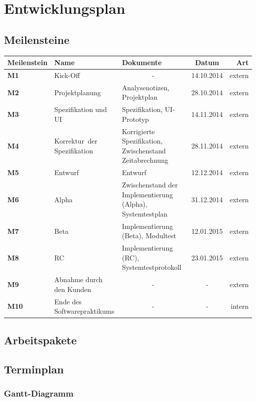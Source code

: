 \documentclass[11pt]{article}
\begin{document}
\section{Entwicklungsplan}

\subsection{Meilensteine}

\begin{tabular}{|l|p{3.5cm}|p{3.5cm}|c|r|}
	\hline
	Meilenstein & Name & Dokumente & Datum & Art \\
	\hline \hline
	\textbf{M1} & Kick-Off & \multicolumn{1}{|c|}{-} & 14.10.2014 & extern \\
	\hline
	\textbf{M2} & Projektplanung & Analysenotizen, Projektplan & 28.10.2014 & extern \\
	\hline
	\textbf{M3} & Spezifikation und UI & Spezifikation, \mbox{UI-Prototyp} & 14.11.2014 & extern \\
	\hline
	\textbf{M4} & \mbox{Korrektur der} Spezifikation & Korrigierte Spezifikation, Zwischenstand Zeitabrechnung & 28.11.2014 & extern \\
	\hline
	\textbf{M5} & Entwurf & Entwurf & 12.12.2014 & extern \\
	\hline
	\textbf{M6} & Alpha & Zwischenstand der Implementierung (Alpha), Systemtestplan & 31.12.2014 & extern \\
	\hline
	\textbf{M7} & Beta & Implementierung (Beta), Modultest & 12.01.2015 & extern \\
	\hline
	\textbf{M8} & RC & Implementierung (RC), Systemtestprotokoll & 23.01.2015 & extern \\
	\hline
	\textbf{M9} & Abnahme durch den Kunden & \multicolumn{1}{|c|}{-} & - & extern \\
	\hline
	\textbf{M10} & Ende des Softwarepraktikums & \multicolumn{1}{|c|}{-} & - & intern \\
	\hline
\end{tabular}

\subsection{Arbeitspakete}

\subsection{Terminplan}

\subsubsection{Gantt-Diagramm}
\end{document}
